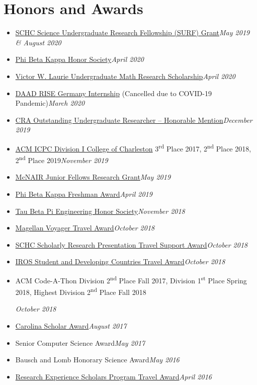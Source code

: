\documentclass[\ifdefined\cv10pt\else11pt\fi,letterpaper]{moderncv}
\newcommand{\cvonly}[1]{\ifdefined\cv#1\fi\ignorespaces}
\renewcommand{\cvitem}[2]{\item {#1}\hfill\textit{#2}}
\newcommand{\st}{\textsuperscript{st}\xspace}
\newcommand{\nd}{\textsuperscript{nd}\xspace}
\newcommand{\rd}{\textsuperscript{rd}\xspace}
\let\oldsection\section
\renewcommand{\section}[1]{\vspace*{-1.3ex}\oldsection{#1}\vspace*{-0.5ex}}
\begin{document}
	\section{Honors and Awards}
	\begin{itemize}
		\cvitem{\href{https://www.sc.edu/study/colleges_schools/honors_college/internal/beyond_the_classroom/undergraduate_research/surf_and_exploration_grants/index.php}{SCHC Science Undergraduate Research Fellowship (SURF) Grant}}{May 2019 \& August 2020}
		\cvitem{\href{https://www.pbk.org/}{Phi Beta Kappa Honor Society}}{April 2020}
		\cvitem{\href{https://sc.edu/study/colleges_schools/artsandsciences/mathematics/study/awards_scholarships/}{Victor W. Laurie Undergraduate Math Research Scholarship}}{April 2020}
		\cvitem{\href{https://www.daad.de/rise/en/rise-germany/}{DAAD RISE Germany Internship} (Cancelled due to COVID-19 Pandemic)}{March 2020}
		\cvitem{\href{https://cra.org/about/awards/outstanding-undergraduate-researcher-award/}{CRA Outstanding Undergraduate Researcher -- Honorable Mention}}{December 2019}  %
		\cvonly{\cvitem{\href{http://compsci.cofc.edu/ACM-ICPC.php}{ACM ICPC Division I College of Charleston} 3\rd Place 2017, 2\nd Place 2018, 2\nd Place 2019}{November 2019}}
		\cvitem{\href{https://sc.edu/about/offices_and_divisions/undergraduate_research/apply_for_funding/other_money_opportunities/cec_mcnair-research-fellows-summer/index.php}{McNAIR Junior Fellows Research Grant}}{May 2019}  %
		\cvitem{\href{https://www.sc.edu/uofsc/announcements/posts/2019/04/university_awards_day_2019.php}{Phi Beta Kappa Freshman Award}}{April 2019}
		\cvitem{\href{https://tbp.org/}{Tau Beta Pi Engineering Honor Society}}{November 2018}
		\cvonly{
			\cvitem{\href{https://www.sc.edu/about/offices_and_divisions/undergraduate_research/apply_for_funding/our_funding/conference-travel/index.php}{Magellan Voyager Travel Award}}{October 2018}
			\cvitem{\href{https://www.sc.edu/study/colleges_schools/honors_college/experience/undergraduate_research/index.php}{SCHC Scholarly Research Presentation Travel Support Award}}{October 2018}
			\cvitem{\href{https://www.iros2018.org/travel-grants}{IROS Student and Developing Countries Travel Award}}{October 2018}
		}
		\cvonly{\cvitem{\parbox[t]{0.75\linewidth}{ACM Code-A-Thon Division 2\nd Place Fall 2017, Division 1\st Place Spring 2018, Highest Division 2\nd Place Fall 2018}\vspace*{0.6ex}}{October 2018}}
		\cvitem{\href{https://sc.edu/about/offices_and_divisions/undergraduate_admissions/honors_and_scholars_programs/top_scholars/}{Carolina Scholar Award}}{August 2017}
		\cvonly{\cvitem{Senior Computer Science Award}{May 2017}}
		\cvonly{\cvitem{Bausch and Lomb Honorary Science Award}{May 2016}}
		\cvonly{\cvitem{\href{https://www.scgssm.org/residential/academics/senior-research}{Research Experience Scholars Program Travel Award}}{April 2016}}
	\end{itemize}
	
\end{document}
